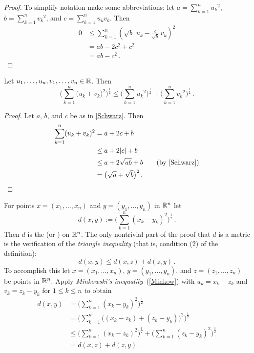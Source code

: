 \begin{proof}  To simplify notation make some abbreviations: let $a = \sum\limits_{k=1}^n {u_k}^2$,
$b = \sum\limits_{k=1}^n {v_k}^2$, and $c = \sum\limits_{k=1}^n u_kv_k$. Then
 \begin{align*}
    0 &\le \sum_{k=1}^n\left(\sqrt b \,\,u_k -
                           \frac c{\sqrt b}\,v_k \right)^2 \\
      &= ab - 2c^2 + c^2 \\
      &= ab - c^2 \,.
 \end{align*}
\end{proof}

\begin{prop}\label{Minkow} Let $u_1, \dots, u_n, v_1, \dots, v_n \in \mathbb{R}$. Then
  \[ \biggl(\sum_{k=1}^n \bigl(u_k + v_k\bigr)^2\biggr)^{\frac12} \le
          \biggl(\sum_{k=1}^n {u_k}^2\biggr)^{\frac12}
                   + \biggl(\sum_{k=1}^n {v_k}^2\biggr)^{\frac12}\,. \]
\end{prop}

\begin{proof}  Let $a$, $b$, and $c$ be as in \ref{Schwarz}. Then
 \begin{align*}
    \sum_{k=1}^n (u_k + v_k)^2 &= a + 2c + b \\
                               &\le a + 2\lvert c\rvert + b \\
                               &\le a + 2\sqrt{ab} + b \qquad \text{(by \ref{Schwarz})} \\
                               &= \bigl(\sqrt a + \sqrt b \bigr)^2 \,.
 \end{align*}
\end{proof}


\begin{exam}\label{Eucl_met} For points $x = (x_1,\dots,x_n)$ and $y = (y_1,\dots,y_n)$ in $\mathbb{R}^n$ let
  \[ d(x,y) := \biggl(\sum_{k=1}^n(x_k - y_k )^2\biggr)^{\frac12}\,. \]
Then $d$ is the
 (or
)  on $\mathbb{R}^n$. The only nontrivial part of the proof that $d$ is a
metric is the verification of the \emph{triangle inequality} (that is, condition (2) of the
definition):
   \[d(x,y) \le d(x,z) + d(z,y)\,.\]
To accomplish this let $x = (x_1,\dots,x_n)$, $y = (y_1,\dots,y_n)$, and $z = (z_1,\dots,z_n)$
be points in $\mathbb{R}^n$. Apply \emph{Minkowski's inequality}~(\ref{Minkow}) with $u_k = x_k - z_k$
and $v_k = z_k - y_k$ for $1 \le k \le n$ to obtain
 \begin{align*}
    d(x,y) &= \biggl(\sum_{k=1}^n (x_k - y_k)^2\biggr)^{\frac12} \\
           &= \biggl(\sum_{k=1}^n \bigl((x_k-z_k)  +
                     (z_k-y_k)\bigr)^2\biggr)^{\frac12} \\
           &\le \biggl(\sum_{k=1}^n (x_k - z_k)^2\biggr)^{\frac12}
                 + \biggl(\sum_{k=1}^n (z_k - y_k)^2\biggr)^{\frac12} \\
          &= d(x,z) + d(z,y) \,.
 \end{align*}
\end{exam}

